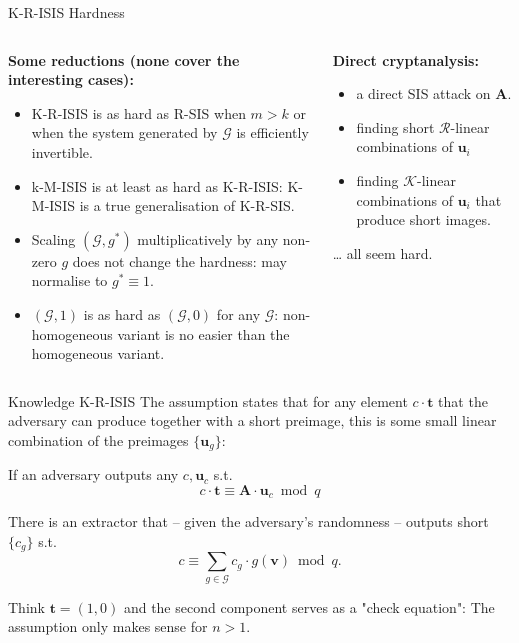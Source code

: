 \documentclass[xcolor=table,10pt,aspectratio=169]{beamer}
\renewcommand{\vec}[1]{\ensuremath{\mathbf{#1}}\xspace}
\providecommand{\mat}[1]{\ensuremath{\vec{#1}}\xspace}
\providecommand{\ring}[0]{\ensuremath{\mathcal{R}}\xspace}
\begin{document}
\begin{frame}[label={sec:org128496d}]{K-R-ISIS Hardness}
\begin{columns}
\begin{column}[t]{0.65\columnwidth}
\textbf{Some reductions (none cover the interesting cases):}
\begin{itemize}
\item K-R-ISIS is as hard as R-SIS when \(m > k\) or when the system generated by \(\mathcal{G}\) is efficiently invertible.
\item k-M-ISIS is at least as hard as K-R-ISIS: K-M-ISIS is a true generalisation of K-R-SIS.
\item Scaling \((\mathcal{G},g^*)\) multiplicatively by any non-zero \(g\) does not change the hardness: may normalise to \(g^{*} \equiv 1\).
\item \((\mathcal{G},1)\) is as hard as \((\mathcal{G},0)\) for any \(\mathcal{G}\): non-homogeneous variant is no easier than the homogeneous variant.
\end{itemize}
\end{column}

\begin{column}[t]{0.35\columnwidth}
\textbf{Direct cryptanalysis:}
\begin{itemize}
\item a direct SIS attack on \(\mat{A}\).
\item finding short \(\ring\)-linear combinations of \(\vec{u}_{i}\)
\item finding \(\mathcal{K}\)-linear combinations of \(\vec{u}_{i}\) that produce short images.
\end{itemize}

… all seem hard.
\end{column}
\end{columns}
\end{frame}

\begin{frame}[label={sec:orgb77593e}]{Knowledge K-R-ISIS}
The assumption states that for any element \(c \cdot \vec{t}\) that the adversary can produce together with a short preimage, this is some small linear combination of the preimages \(\{\vec{u}_{g}\}\):

\begin{definition}
If an adversary outputs any \(c, \vec{u}_{c}\) s.t.
\[
c \cdot \vec{t} \equiv \mat{A} \cdot \vec{u}_{c} \bmod q
\]

There is an extractor that -- given the adversary's randomness -- outputs short
\(\{c_{g}\}\) s.t.
\[
c \equiv \sum_{g \in \mathcal{G}} c_{g} \cdot g(\vec{v}) \bmod q.
\]
\end{definition}

Think \(\vec{t} = (1,0)\) and the second component serves as a "check equation": The assumption only makes sense for \(n>1\).
\end{frame}
\end{document}
